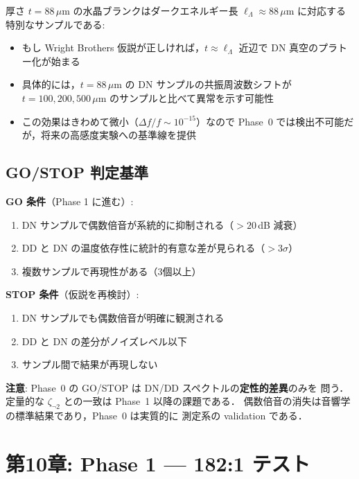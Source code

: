 厚さ $t = 88\,\mu$m の水晶ブランクはダークエネルギー長
$\ell_\Lambda \approx 88\,\mu$m に対応する特別なサンプルである:

\begin{itemize}
\item もし Wright Brothers 仮説が正しければ，$t \approx \ell_\Lambda$ 近辺で
  DN 真空のプラトー化が始まる
\item 具体的には，$t = 88\,\mu$m の DN サンプルの共振周波数シフトが
  $t = 100, 200, 500\,\mu$m のサンプルと比べて異常を示す可能性
\item この効果はきわめて微小（$\Delta f / f \sim 10^{-15}$）なので
  Phase~0 では検出不可能だが，将来の高感度実験への基準線を提供
\end{itemize}

\subsection{GO/STOP 判定基準}

\begin{gostopbox}
\textbf{GO 条件}（Phase 1 に進む）:
\begin{enumerate}
\item DN サンプルで偶数倍音が系統的に抑制される（$> 20$\,dB 減衰）
\item DD と DN の温度依存性に統計的有意な差が見られる（$> 3\sigma$）
\item 複数サンプルで再現性がある（3個以上）
\end{enumerate}

\textbf{STOP 条件}（仮説を再検討）:
\begin{enumerate}
\item DN サンプルでも偶数倍音が明確に観測される
\item DD と DN の差分がノイズレベル以下
\item サンプル間で結果が再現しない
\end{enumerate}

\textbf{注意}: Phase~0 の GO/STOP は DN/DD スペクトルの\textbf{定性的差異}のみを
問う．定量的な $\zeta_{\neg 2}$ との一致は Phase~1 以降の課題である．
偶数倍音の消失は音響学の標準結果であり，Phase~0 は実質的に
測定系の validation である．
\end{gostopbox}

\newpage
\section{第10章: Phase 1 — 182:1 テスト}

